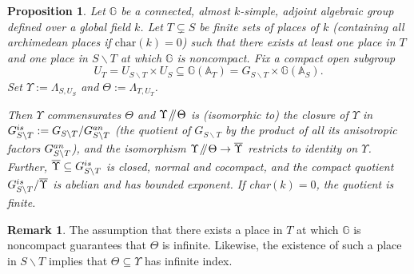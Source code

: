 \documentclass[11pt]{article}
\numberwithin{equation}{section}\providecommand{\llangle}{\langle\!\langle}\providecommand{\rrangle}{\rangle\!\rangle}\providecommand{\Asterisk}{\ast}
\newcommand{\Y}{\ensuremath{\Upsilon}}
\let\bs\backslash
\newcommand{\sslash}{\mathbin{\mkern-3mu /\mkern-5mu/ \mkern-3mu}}
\newcommand{\bbA}{\ensuremath{\mathbb{A}}}
\newcommand{\bbG}{\ensuremath{\mathbb{G}}}
\newtheorem{prop}[thm]{Proposition}
\theoremstyle{definition}
\newtheorem{rem}[thm]{Remark}
\begin{document}
\begin{prop}\label{prop:schlichting-arithmetic}
Let $\bbG$ be a connected, almost $k$-simple, adjoint algebraic group defined over a global field $k$. Let $T\subsetneq S$ be finite sets of places of $k$ (containing all archimedean places if $\mathrm{char}(k)=0$) such that there exists at least one place in $T$ and one place in $S\bs T$ at which $\bbG$ is noncompact. Fix a compact open subgroup
\[
U_T=U_{S\bs T} \times U_S\subseteq \bbG(\bbA_T)=G_{S\bs T}\times \bbG(\bbA_S).
\]
Set $\Y:=\Lambda_{S,U_S}$ and $\Theta:=\Lambda_{T,U_T}$.

Then $\Y$ commensurates $\Theta$ and $\Y\sslash\Theta$ is (isomorphic to) the closure of $\Y$ in $G_{S\bs T}^{\textup{is}}:=G_{S\bs T}/G_{S\bs T}^{\textup{an}}$ (the quotient of $G_{S\bs T}$ by the product of all its anisotropic factors $G_{S\bs T}^{\textup{an}}$), and the isomorphism $\Y\sslash\Theta\to\overline{\Y}$ restricts to identity on $\Y$. Further, $\overline{\Y}\subseteq G_{S\bs T}^{\textup{is}}$ is closed, normal and cocompact, and the compact quotient $G_{S\bs T}^{\textup{is}}/\overline{\Y}$ is abelian and has bounded exponent. If char$(k)=0$, the quotient is finite.
\end{prop}
\begin{rem}\label{rem:infty}
The assumption that there exists a place in $T$ at which $\bbG$ is noncompact guarantees that $\Theta$ is infinite. Likewise, the existence of such a place in $S\bs T$ implies that $\Theta\subseteq \Y$ has infinite index.\end{rem}
\end{document}
